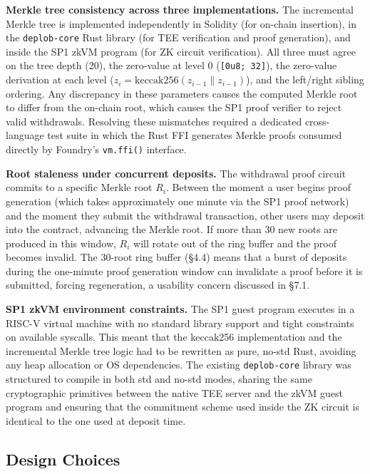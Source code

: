 \documentclass[12pt,a4paper]{article}
\begin{document}
\textbf{Merkle tree consistency across three implementations.} The incremental Merkle tree is implemented independently in Solidity (for on-chain insertion), in the \texttt{deplob-core} Rust library (for TEE verification and proof generation), and inside the SP1 zkVM program (for ZK circuit verification). All three must agree on the tree depth (20), the zero-value at level 0 (\texttt{[0u8; 32]}), the zero-value derivation at each level ($z_i = \text{keccak256}(z_{i-1} \| z_{i-1})$), and the left/right sibling ordering. Any discrepancy in these parameters causes the computed Merkle root to differ from the on-chain root, which causes the SP1 proof verifier to reject valid withdrawals. Resolving these mismatches required a dedicated cross-language test suite in which the Rust FFI generates Merkle proofs consumed directly by Foundry's \texttt{vm.ffi()} interface.

\textbf{Root staleness under concurrent deposits.} The withdrawal proof circuit commits to a specific Merkle root $R_i$. Between the moment a user begins proof generation (which takes approximately one minute via the SP1 proof network) and the moment they submit the withdrawal transaction, other users may deposit into the contract, advancing the Merkle root. If more than 30 new roots are produced in this window, $R_i$ will rotate out of the ring buffer and the proof becomes invalid. The 30-root ring buffer (§4.4) means that a burst of deposits during the one-minute proof generation window can invalidate a proof before it is submitted, forcing regeneration, a usability concern discussed in §7.1.

\textbf{SP1 zkVM environment constraints.} The SP1 guest program executes in a RISC-V virtual machine with no standard library support and tight constraints on available syscalls. This meant that the keccak256 implementation and the incremental Merkle tree logic had to be rewritten as pure, no-std Rust, avoiding any heap allocation or OS dependencies. The existing \texttt{deplob-core} library was structured to compile in both std and no-std modes, sharing the same cryptographic primitives between the native TEE server and the zkVM guest program and ensuring that the commitment scheme used inside the ZK circuit is identical to the one used at deposit time.

\subsection{Design Choices}
\end{document}
